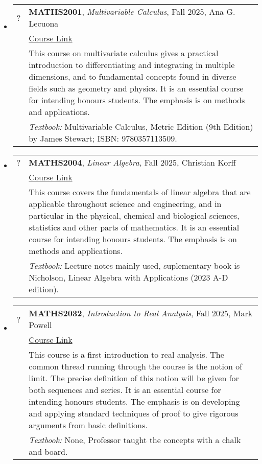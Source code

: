 \documentclass[12pt]{article}
\begin{document}
\begin{itemize}[leftmargin = *]
    \item[]
        \begin{tabularx}{\textwidth}{@{}lX@{}}
            ? & \textbf{MATHS2001}, \textit{Multivariable Calculus}, Fall 2025, Ana G. Lecuona
            \\
            &
            \href{https://www.gla.ac.uk/coursecatalogue/course/?code=MATHS2001}{Course Link} \\
            &
            This course on multivariate calculus gives a practical introduction to differentiating and integrating in multiple dimensions, and to fundamental concepts found in diverse fields such as geometry and physics. It is an essential course for intending honours students. The emphasis is on methods and applications.            \\
            & \textit{Textbook:} Multivariable Calculus, Metric Edition (9th Edition) by James Stewart; ISBN: 9780357113509.
        \end{tabularx}
            \item[]
        \begin{tabularx}{\textwidth}{@{}lX@{}}
            ? & \textbf{MATHS2004}, \textit{Linear Algebra}, Fall 2025,  Christian Korff
            \\
            &
            \href{https://www.gla.ac.uk/coursecatalogue/course/?code=MATHS2004}{Course Link} \\
            &
            This course covers the fundamentals of linear algebra that are applicable throughout science and engineering, and in particular in the physical, chemical and biological sciences, statistics and other parts of mathematics. It is an essential course for intending honours students. The emphasis is on methods and applications.            \\
            & \textit{Textbook:} Lecture notes mainly used, suplementary book is Nicholson, Linear Algebra with Applications (2023 A-D edition).
        \end{tabularx}
         \item[]
        \begin{tabularx}{\textwidth}{@{}lX@{}}
            ? & \textbf{MATHS2032}, \textit{Introduction to Real Analysis}, Fall 2025,  Mark Powell
            \\
            &
            \href{https://www.gla.ac.uk/coursecatalogue/course/?code=MATHS2032}{Course Link} \\
            &
            This course is a first introduction to real analysis. The common thread running through the course is the notion of limit. The precise definition of this notion will be given for both sequences and series. It is an essential course for intending honours students. The emphasis is on developing and applying standard techniques of proof to give rigorous arguments from basic definitions.            \\
            & \textit{Textbook:}  None, Professor taught the concepts with a chalk and board.
        \end{tabularx}
        

\end{itemize}
\end{document}
